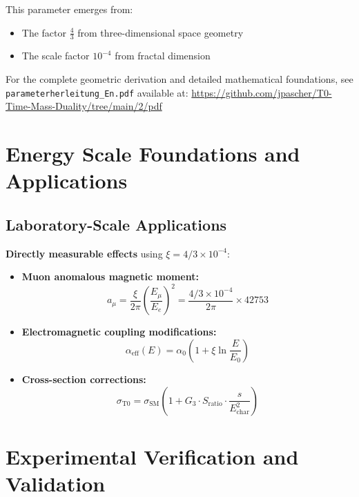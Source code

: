 \documentclass[12pt,a4paper]{report}
\begin{document}
This parameter emerges from:
\begin{itemize}
	\item The factor $\frac{4}{3}$ from three-dimensional space geometry
	\item The scale factor $10^{-4}$ from fractal dimension
\end{itemize}

For the complete geometric derivation and detailed mathematical foundations, 
see \texttt{parameterherleitung\_En.pdf} available at:
\url{https://github.com/jpascher/T0-Time-Mass-Duality/tree/main/2/pdf}

\section{Energy Scale Foundations and Applications}
\label{sec:energy_foundations}

\subsection{Laboratory-Scale Applications}
\label{subsec:laboratory_applications}

\textbf{Directly measurable effects} using $\xi = 4/3 \times 10^{-4}$:

\begin{itemize}
	\item \textbf{Muon anomalous magnetic moment:}
	\begin{equation}
		a_\mu = \frac{\xi}{2\pi} \left(\frac{E_\mu}{E_e}\right)^2 = \frac{4/3 \times 10^{-4}}{2\pi} \times 42753
	\end{equation}
	
	\item \textbf{Electromagnetic coupling modifications:}
	\begin{equation}
		\alpha_{\text{eff}}(E) = \alpha_0 \left(1 + \xi \ln\frac{E}{E_0}\right)
	\end{equation}
	
	\item \textbf{Cross-section corrections:}
	\begin{equation}
		\sigma_{\text{T0}} = \sigma_{\text{SM}} \left(1 + G_3 \cdot S_{\text{ratio}} \cdot \frac{s}{E_{\text{char}}^2}\right)
	\end{equation}
\end{itemize}

\section{Experimental Verification and Validation}
\label{sec:experimental_verification}
\end{document}
